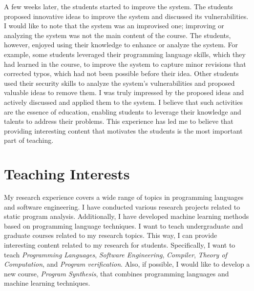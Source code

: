 \documentclass[11pt]{article}
\begin{document}
A few weeks later, the students started to improve the system.
%
The students proposed innovative ideas to improve the system and discussed its vulnerabilities.
%
I would like to note that the system was an improvised one; improving or analyzing the system was not the main content of the course. 
%
The students, however, enjoyed using their knowledge to enhance or analyze the system. 
%
For example, some students leveraged their programming language skills, which they had learned in the course, to improve the system to capture minor revisions that corrected typos, which had not been possible before their idea.
%
Other students used their security skills to analyze the system's vulnerabilities and proposed valuable ideas to remove them. 
%
I was truly impressed by the proposed ideas and actively discussed and applied them to the system.
%
I believe that such activities are the essence of education, enabling students to leverage their knowledge and talents to address their problems.
%
This experience has led me to believe that providing interesting content that motivates the students is the most important part of teaching.











\section{Teaching Interests}
My research experience covers a wide range of topics in programming languages and software engineering.
%
I have conducted various research projects related to static program analysis.
%
Additionally, I have developed machine learning methods based on programming language techniques.
%
I want to teach undergraduate and graduate courses related to my research topics.
%
This way, I can provide interesting content related to my research for students.
%
Specifically, I want to teach {\it Programming Languages}, {\it Software Engineering}, {\it Compiler}, {\it Theory of Computation}, and {\it Program verification}.
%
Also, if possible, I would like to develop a new course, {\it Program Synthesis}, that combines programming languages and machine learning techniques.
\end{document}
